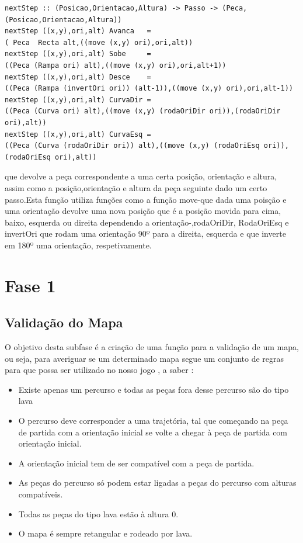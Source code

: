 \documentclass[a4paper]{report} %
\begin{document}
\begin{verbatim}
nextStep :: (Posicao,Orientacao,Altura) -> Passo -> (Peca,(Posicao,Orientacao,Altura))
nextStep ((x,y),ori,alt) Avanca   = 
( Peca  Recta alt,((move (x,y) ori),ori,alt))
nextStep ((x,y),ori,alt) Sobe     = 
((Peca (Rampa ori) alt),((move (x,y) ori),ori,alt+1))
nextStep ((x,y),ori,alt) Desce    = 
((Peca (Rampa (invertOri ori)) (alt-1)),((move (x,y) ori),ori,alt-1))
nextStep ((x,y),ori,alt) CurvaDir = 
((Peca (Curva ori) alt),((move (x,y) (rodaOriDir ori)),(rodaOriDir ori),alt))
nextStep ((x,y),ori,alt) CurvaEsq = 
((Peca (Curva (rodaOriDir ori)) alt),((move (x,y) (rodaOriEsq ori)),(rodaOriEsq ori),alt))
\end{verbatim}
que devolve a peça correspondente a uma certa posição, orientação e altura, assim como a posição,orientação e altura da peça seguinte dado um certo passo.Esta função utiliza funções como a função move-que dada uma poisção e uma orientação devolve uma nova posição que é a posição movida para cima, baixo, esquerda ou direita dependendo a orientação-,rodaOriDir, RodaOriEsq e invertOri que rodam uma orientação 90º para a direita, esquerda e que inverte em 180º uma orientação, respetivamente.


\section{Fase 1}

\subsection{Validação do Mapa}
O objetivo desta subfase é a criação de uma função para a validação de um mapa, ou seja, para averiguar se um determinado mapa segue um conjunto de regras para que possa ser utilizado no nosso jogo , a saber :

\begin{itemize}
    \item Existe apenas um percurso e todas as peças fora desse percurso são do tipo lava
    \item O percurso deve corresponder a uma trajetória, tal que começando na peça de partida com a orientação inicial se volte a chegar à peça de partida com orientação inicial.
    \item A orientação inicial tem de ser compatível com a peça de partida.
    \item As peças do percurso só podem estar ligadas a peças do percurso com alturas compatíveis.
    \item Todas as peças do tipo lava estão à altura 0.
    \item O mapa é sempre retangular e rodeado por lava.
\end{itemize}
\end{document}
